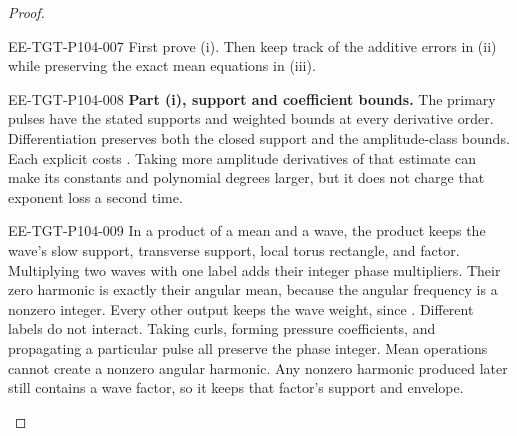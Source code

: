 \begin{proof}
\begin{EESegment}{EE-TGT-P104-007}
First prove (i). Then keep track of the additive errors in (ii) while preserving the exact mean
equations in (iii).
\end{EESegment}

\begin{EESegment}{EE-TGT-P104-008}
\noindent\textbf{Part (i), support and coefficient bounds.} The primary pulses have the stated
supports and weighted bounds at every derivative order. Differentiation preserves both the closed
support and the amplitude-class bounds. Each explicit  costs
. Taking more amplitude derivatives of that estimate can make its
constants and polynomial degrees larger, but it does not charge that exponent loss a second time.
\end{EESegment}

\begin{EESegment}{EE-TGT-P104-009}
In a product of a mean and a wave, the product keeps the wave's slow support, transverse support,
local torus rectangle, and  factor. Multiplying two waves with one label
adds their integer phase multipliers. Their zero harmonic is exactly their angular mean, because the
angular frequency  is a nonzero integer. Every other output keeps the wave
weight, since . Different labels do not interact. Taking curls,
forming pressure coefficients, and propagating a particular pulse all preserve the phase integer.
Mean operations cannot create a nonzero angular harmonic. Any nonzero harmonic produced later still
contains a wave factor, so it keeps that factor's support and envelope.
\end{EESegment}


\end{proof}
